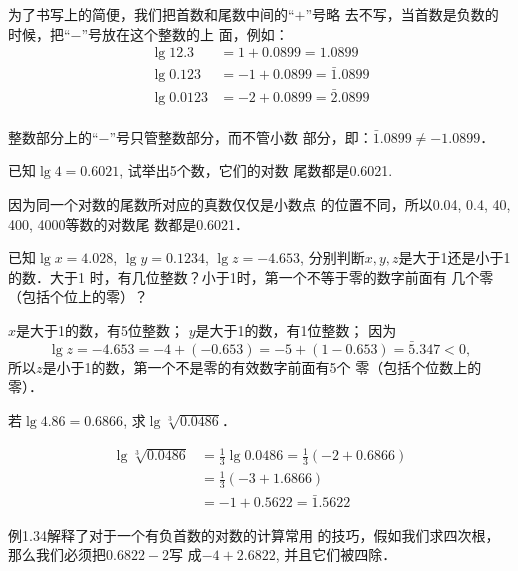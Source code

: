 为了书写上的简便，我们把首数和尾数中间的“$+$”号略
去不写，当首数是负数的时候，把“$-$”号放在这个整数的上
面，例如：
\[\begin{split}
    \lg 12.3&=1+0.0899=1.0899\\
    \lg 0.123&=-1+0.0899=\bar{1}.0899\\
    \lg 0.0123&=-2+0.0899=\bar{2}.0899\\
\end{split}\]

\begin{rmk}
   整数部分上的“$-$”号只管整数部分，而不管小数
部分，即：$\bar{1}.0899\ne -1.0899$．
\end{rmk}


\begin{example}
    已知$\lg4=0.6021$, 试举出5个数，它们的对数
    尾数都是0.6021.
\end{example}

\begin{solution}
    因为同一个对数的尾数所对应的真数仅仅是小数点
的位置不同，所以0.04, 0.4, 40, 400, 4000等数的对数尾
数都是0.6021．
\end{solution}

\begin{example}
    已知$\lg x=4.028$, $\lg y=0.1234$, $\lg z=-4.653$,
    分别判断$x,y,z$是大于1还是小于1的数．大于1
    时，有几位整数？小于1时，第一个不等于零的数字前面有
    几个零（包括个位上的零）？
\end{example}

\begin{solution}
    $x$是大于1的数，有5位整数；
$y$是大于1的数，有1位整数；
因为
\[
    \lg z=-4.653=-4+(-0.653)=-5+(1-0.653)=\bar{5}.347<0,
\]
所以$z$是小于1的数，第一个不是零的有效数字前面有5个
零（包括个位数上的零）．
\end{solution}


\begin{example}
    若$\lg4.86=0.6866$, 求$\lg\sqrt[3]{0.0486}$．
\end{example}


\begin{solution}
\[\begin{split}
    \lg\sqrt[3]{0.0486}&=\frac{1}{3}\lg0.0486=\frac{1}{3}(-2+0.6866)\\
    &=\frac{1}{3}(-3+1.6866)\\
    &=-1+0.5622=\bar{1}.5622
\end{split}\]
\end{solution}

\begin{rmk}
    例1.34解释了对于一个有负首数的对数的计算常用
的技巧，假如我们求四次根，那么我们必须把$0.6822-2$写
成$-4+2.6822$, 并且它们被四除．
\end{rmk}

